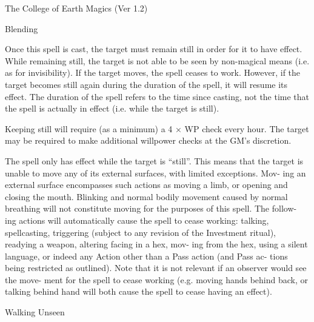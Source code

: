 \begin{Chapter}{The College of Earth Magics (Ver 1.2)}
\begin{spell}[G-4]{Blending }
\begin{effects}
 Once  this  spell  is  cast,  the  target  must 
remain  still  in  order  for  it  to  have  effect.  While 
remaining still, the target is not able to be seen by 
non-magical  means  (i.e.  as  for  invisibility).  If  the 
target moves, the spell ceases to work. However, if 
the target becomes still again during the duration of 
the  spell,  it  will  resume  its  effect.  The  duration  of 
the  spell  refers  to  the  time  since  casting,  not  the 
time  that  the  spell  is  actually  in  effect  (i.e.  while 
the target is still). 

Keeping still will require (as a minimum) a 4 × WP 
check  every  hour.  The  target  may  be  required  to 
make  additional  willpower  checks  at  the  GM’s 
discretion. 

The spell only has effect while the target is “still”. 
This means that the target is unable to move any of 
its external surfaces, with limited exceptions. Mov-
ing  an  external  surface  encompasses  such  actions 
as  moving  a  limb,  or  opening  and  closing  the 
mouth.  Blinking  and  normal  bodily  movement 
caused  by  normal  breathing  will  not  constitute 
moving  for  the  purposes  of  this  spell.  The  follow-
ing  actions  will  automatically  cause  the  spell  to 
cease  working:  talking,  spellcasting,  triggering 
(subject  to  any  revision  of  the  Investment  ritual), 
readying  a  weapon,  altering  facing  in  a  hex,  mov-
ing from the hex, using a silent language, or indeed 
any  Action  other  than  a  Pass  action  (and  Pass  ac-
tions  being  restricted  as  outlined).  Note  that  it  is 
not  relevant  if  an  observer  would  see  the  move-
ment  for  the  spell  to  cease  working  (e.g.  moving 
hands  behind  back,  or  talking  behind  hand  will 
both cause the spell to cease having an effect). 

\end{effects}
\end{spell}

\begin{spell}[G-5]{Walking Unseen }


\end{spell}
\end{Chapter}
